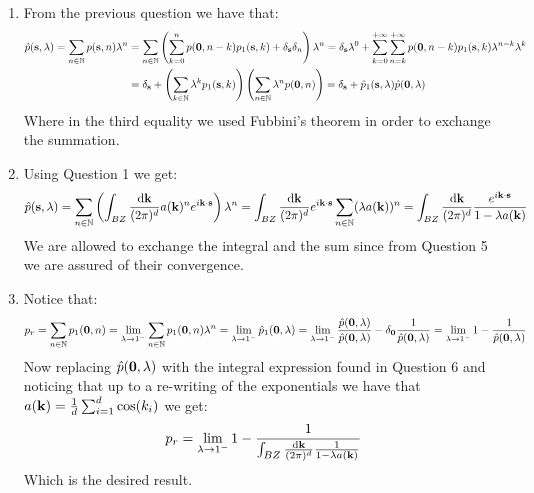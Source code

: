 \documentclass[10pt,a4paper]{article}
\begin{document}
\begin{enumerate}
\item From the previous question we have that:
\begin{align*}
\hat{p}(\vb{s}, \lambda) = \sum_{n \in \mathbb{N}} p(\vb{s}, n) \lambda^n &= \sum_{n \in \mathbb{N}} \left(\sum_{k = 0}^n p(\vb{0}, n - k) p_1(\vb{s}, k) + \delta_{\vb{s}} \delta_n \right) \lambda^n = \delta_{\vb{s}} \lambda^0 + \sum_{k = 0}^{+\infty} \sum_{n = k}^{+\infty} p(\vb{0}, n - k) p_1(\vb{s}, k) \lambda^{n - k} \lambda^k\\
&= \delta_{\vb{s}} + \left( \sum_{k \in \mathbb{N}} \lambda^k p_1(\vb{s}, k) \right)\left( \sum_{n \in \mathbb{N}} \lambda^n p(\vb{0}, n) \right) = \delta_{\vb{s}} + \hat{p}_1(\vb{s}, \lambda) \hat{p}(\vb{0}, \lambda)
\end{align*}
Where in the third equality we used Fubbini's theorem in order to exchange the summation. 

\item Using Question 1 we get:
\[
\hat{p}(\vb{s}, \lambda) = \sum_{n \in \mathbb{N}} \left( \int_{BZ} \frac{\dd \vb{k}}{(2 \pi)^d} a(\vb{k})^n e^{i \vb{k} \cdot \vb{s}}  \right) \lambda^n = \int_{BZ} \frac{\dd \vb{k}}{(2 \pi)^d} e^{i \vb{k}\cdot \vb{s}} \sum_{n \in \mathbb{N}} (\lambda a(\vb{k}))^n = \int_{BZ} \frac{\dd \vb{k}}{(2 \pi)^d} \frac{e^{i \vb{k}\cdot \vb{s}}}{1 - \lambda a(\vb{k})}
\]
We are allowed to exchange the integral and the sum since from Question 5 we are assured of their convergence.

\item Notice that:
\[
p_r = \sum_{n \in \mathbb{N}} p_1(\vb{0}, n) = \lim_{\lambda \to 1^-} \sum_{n \in\mathbb{N}} p_1(\vb{0}, n) \lambda^n = \lim_{\lambda \to 1^-} \hat{p}_1(\vb{0}, \lambda) = \lim_{\lambda \to 1^-} \frac{\hat{p}(\vb{0}, \lambda)}{\hat{p}(\vb{0}, \lambda)} - \delta_{\vb{0}} \frac{1}{\hat{p}(\vb{0}, \lambda)} = \lim_{\lambda \to 1^-} 1 - \frac{1}{\hat{p}(\vb{0}, \lambda)}
\]
Now replacing $\hat{p}(\vb{0}, \lambda)$ with the integral expression found in Question 6 and noticing that up to a re-writing of the exponentials we have that $a(\vb{k}) = \frac{1}{d} \sum_{i = 1}^d \cos(k_i)$ we get:
\[
p_r = \lim_{\lambda \to 1^-} 1 - \frac{1}{\int_{BZ} \frac{\dd \vb{k}}{(2 \pi)^d} \frac{1}{1 - \lambda a(\vb{k})}}
\]
Which is the desired result.


\end{enumerate}
\end{document}
